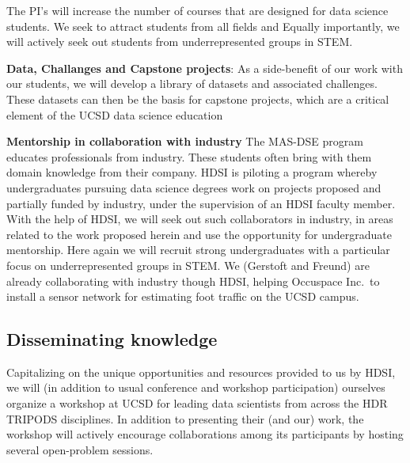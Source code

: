 The PI's will increase the number of courses that are designed for data science students. We seek to attract students from 
all fields and Equally importantly, we will actively seek out students from underrepresented groups in STEM.

{\bf Data, Challanges and Capstone projects}: As a side-benefit of our work with our students, we will develop a library of datasets and associated challenges. These datasets can then be the basis for capstone projects, which are a critical element of the UCSD data science education


{\bf Mentorship in collaboration with industry} The MAS-DSE program educates professionals from industry. These students often bring with them domain knowledge from their company. HDSI is piloting a program whereby undergraduates pursuing data science degrees work on projects proposed and partially funded by industry, under the supervision of an HDSI faculty member. With the help of HDSI, we will seek out such collaborators in industry, in areas related to the work proposed herein and use the opportunity for undergraduate mentorship. Here again we will recruit strong undergraduates with a particular focus on underrepresented groups in STEM. We (Gerstoft and Freund) are already collaborating with industry though HDSI, helping Occuspace Inc.\ to install a sensor network for estimating foot traffic on the UCSD campus.

\subsection*{Disseminating knowledge}
Capitalizing on the unique opportunities and resources provided to us by HDSI, we will (in addition to usual conference and workshop participation) ourselves organize a workshop at UCSD for leading data scientists from across the HDR TRIPODS disciplines. In addition to presenting their (and our) work, the workshop will actively encourage collaborations among its participants by hosting several open-problem sessions.